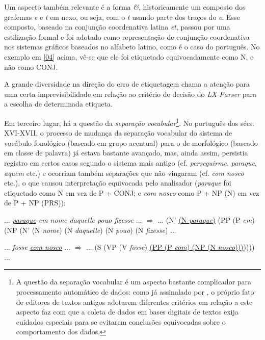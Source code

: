 \documentclass[portuguese]{textolivre}
\begin{document}
Um aspecto também relevante é a forma \textit{\&}, historicamente um composto dos grafemas \textit{e} e \textit{t} em nexo, ou seja, com o \textit{t} usando parte dos traços do \textit{e}. Esse composto, baseado na conjunção coordenativa latina \textit{et}, passou por uma estilização formal e foi adotado como representação de conjunção coordenativa nos sistemas gráficos baseados no alfabeto latino, como é o caso do português. No exemplo em \ref{04} acima, vê-se que ele foi etiquetado equivocadamente como N, e não como CONJ.

A grande diversidade na direção do erro de etiquetagem chama a atenção para uma certa imprevisibilidade em relação ao critério de decisão do \textit{LX-Parser} para a escolha de determinada etiqueta.
	
Em terceiro lugar, há a questão da \textit{separação vocabular}\footnote{A questão da separação vocabular é um aspecto bastante complicador para processamento automático de dados: como já assinalado por \textcite{cambraia_edicoes_2007}, o próprio fato de editores de textos antigos adotarem diferentes critérios em relação a este aspecto faz com que a coleta de dados em bases digitais de textos exija cuidados especiais para se evitarem conclusões equivocadas sobre o comportamento dos dados.}. No português dos sécs. XVI-XVII, o processo de mudança da separação vocabular do sistema de vocábulo fonológico (baseado em grupo acentual) para o de morfológico (baseado em classe de palavra) já estava bastante avançado, mas, ainda assim, persistia registro em certos casos segundo o sistema mais antigo (cf. \textit{perseguirme}, \textit{paraque}, \textit{aquem} etc.) e ocorriam também separações que não vingaram (cf. \textit{com nosco} etc.), o que causou interpretação equivocada pelo analisador (\textit{paraque} foi etiquetado como N em vez de P + CONJ; e \textit{com nosco} como P + NP (N) em vez de P + NP (PRS)):

\begin{description}[topsep=10pt, parsep=2pt, itemindent=!]
\item[(09)\label{09}] 
... \textit{\underline{paraque} em nome daquelle pouo fizesse} ... $\Rightarrow$ ... (N' \uline{(N \textit{paraque})} (PP (P \textit{em}) (NP (N' (N \textit{nome}) (N \textit{daquelle}) (N \textit{pouo}) (N \textit{fizesse}) ...

\item[(10)\label{10}] 
... \textit{fosse \underline{com nosco}} ... $\Rightarrow$ ... (S (VP (V \textit{fosse}) \uline{(PP (P \textit{com}) (NP (N \textit{nosco})))})))) ...

\end{description}
\end{document}

